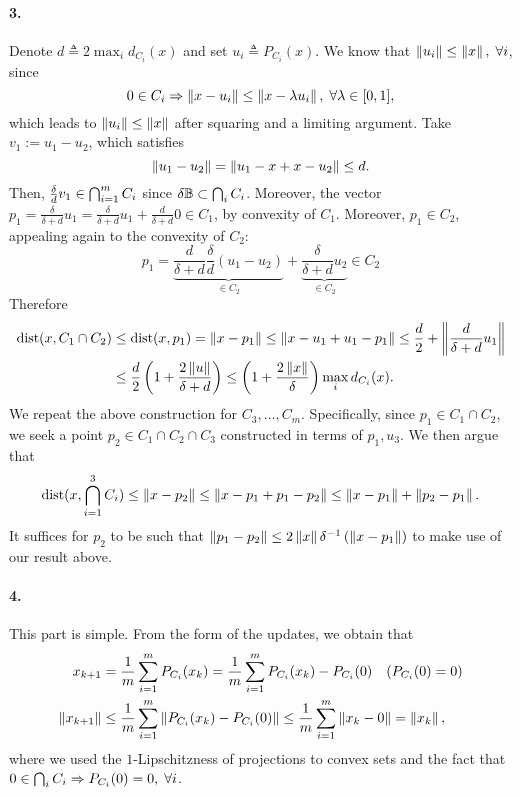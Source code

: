 \documentclass[10pt]{article}
\begin{document}
\paragraph{3.}
Denote $d \triangleq 2 \max_i d_{C_i}(x)$ and set $u_i \triangleq P_{C_i}(x)$.
We know that $\left \| u_i \right \| \leq \left \| x \right \|, \; \forall i$, since
\[
    0 \in C_i \Rightarrow
    \left \| x - u_i \right \| \leq \left \| x - \lambda u_i \right \|, \; \forall \lambda \in [0, 1],
\]
which leads to $\left \| u_i \right \| \leq \left \| x \right \|$ after squaring and a limiting
argument. Take $v_1 := u_1 - u_2$, which satisfies
\[
    \left \| u_1 - u_2 \right \| = \left \| u_1 - x + x - u_2 \right \| \leq d.
\]
Then, $\frac{\delta}{d} v_1 \in \operatorname*{\bigcap}_{i=1}^m C_i$ since $\delta \mathbb{B}
\subset \operatorname*{\bigcap}_i C_i$. Moreover, the vector $p_1 = \frac{\delta}{\delta + d} u_1
= \frac{\delta}{\delta + d} u_1 + \frac{d}{\delta + d} 0 \in C_1$, by convexity
of $C_1$. Moreover, $p_1 \in C_2$, appealing again to the convexity of $C_2$:
\[
    p_1 = \underbrace{\frac{d}{\delta + d} \frac{\delta}{d} (u_1 - u_2)}_{\in
    C_2} + \underbrace{\frac{\delta}{\delta + d} u_2}_{\in C_2} \in C_2
\]
Therefore
\begin{align*}
    \mathrm{dist}(x, C_1 \cap C_2) &\leq \mathrm{dist}(x, p_1)
    = \left \| x - p_1 \right \| \leq \left \| x - u_1 + u_1 - p_1 \right \| \leq \frac{d}{2}
    + \left \| \frac{d}{\delta + d} u_1 \right \| \\
    &\leq \frac{d}{2} \left(1 + \frac{2 \left \| u \right \|}{\delta + d}\right)
     \leq \left(1 + \frac{2 \left \| x \right \|}{\delta}\right) \max_i d_{C_i}(x).
\end{align*}
We repeat the above construction for $C_3, \dots, C_m$. Specifically, since
$p_1 \in C_1 \cap C_2$, we seek a point $p_2 \in C_1 \cap C_2 \cap C_3$
constructed in terms of $p_1, u_3$. We then argue that
\[
    \mathrm{dist}(x, \operatorname*{\bigcap}_{i=1}^3 C_i) \leq \left \| x - p_2 \right \| \leq
    \left \| x - p_1 + p_1 - p_2 \right \| \leq \left \| x - p_1 \right \| + \left \| p_2 - p_1 \right \|.
\]
It suffices for $p_2$ to be such that $\left \| p_1 - p_2 \right \| \leq 2 \left \| x \right \|
\delta^{-1} \left( \left \| x - p_1 \right \| \right)$ to make use of our result above.

\paragraph{4.}
This part is simple. From the form of the updates, we obtain that
\begin{align*}
    x_{k+1} &= \frac{1}{m} \sum_{i=1}^m P_{C_i}(x_k) =
        \frac{1}{m} \sum_{i=1}^m P_{C_i}(x_k) - P_{C_i}(0) \quad (P_{C_i}(0) =
        0) \\
    \left \| x_{k+1} \right \| &\leq \frac{1}{m} \sum_{i=1}^m \left \| P_{C_i}(x_k) -
    P_{C_i}(0) \right \| \leq \frac{1}{m} \sum_{i=1}^m \left \| x_k - 0 \right \| = \left \| x_k \right \|,
\end{align*}
where we used the $1$-Lipschitzness of projections to convex sets and the fact
that $0 \in \operatorname*{\bigcap}_i C_i \Rightarrow P_{C_i}(0) = 0, \; \forall i$.
\end{document}
